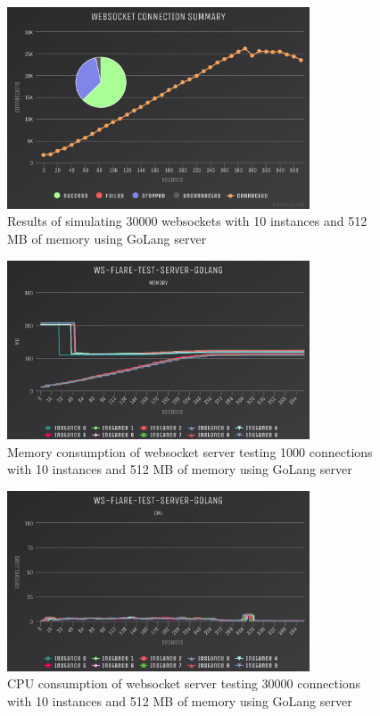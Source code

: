 \begin{figure}[H]
  \centering
    \includegraphics[width=0.8\textwidth]{figures/experiments/experiment-1/golang/conn-30000-512-10.png}
    \caption{Results of simulating 30000 websockets with 10 instances and 512 MB of memory using GoLang server}
    \label{fig:experiment-1-golang-conn-30000-512-10}
\end{figure}

\begin{figure}[H]
  \centering
    \includegraphics[width=0.8\textwidth]{figures/experiments/experiment-1/golang/memory-30000-512-10.png}
    \caption{Memory consumption of websocket server testing 1000 connections with 10 instances and 512 MB of memory using GoLang server}
    \label{fig:experiment-1-golang-memory-30000-512-10}
\end{figure}

\begin{figure}[H]
  \centering
    \includegraphics[width=0.8\textwidth]{figures/experiments/experiment-1/golang/cpu-30000-512-10.png}
    \caption{CPU consumption of websocket server testing 30000 connections with 10 instances and 512 MB of memory using GoLang server}
    \label{fig:experiment-1-golang-cpu-30000-512-10}
\end{figure}

